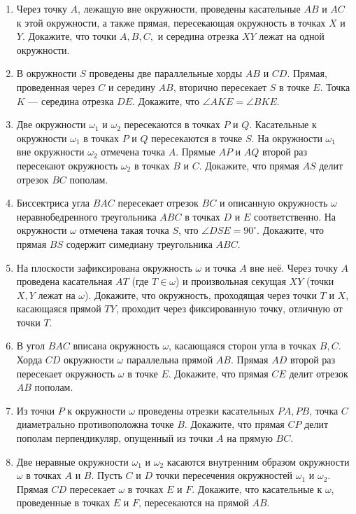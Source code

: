 \documentclass{article}
\begin{document}
\begin{enumerate}[label*=\protect\fbox{\arabic{enumi}}]
\item Через точку $A$, лежащую вне окружности, проведены касательные $AB$ и $AC$ к этой окружности, а также прямая, пересекающая окружность в точках $X$ и $Y$. Докажите, что точки $A, B, C,$ и середина отрезка $XY$ лежат на одной окружности.

\item В окружности $S$ проведены две параллельные хорды $AB$ и $CD$. Прямая, проведенная через $C$ и середину $AB$, вторично пересекает $S$ в точке $E$. Точка $K$ — середина отрезка $DE$. Докажите, что $\angle AKE = \angle BKE.$

\item Две окружности $\omega_1$ и $\omega_2$ пересекаются в точках $P$ и $Q$. Касательные к окружности $\omega_1$ в точках $P$ и $Q$ пересекаются в точке $S$. На окружности $\omega_1$ вне окружности $\omega_2$
отмечена точка $A$. Прямые $AP$ и $AQ$ второй раз пересекают окружность $\omega_2$ в точках
$B$ и $C$. Докажите, что прямая $AS$ делит отрезок $BC$ пополам.

\item Биссектриса угла $BAC$ пересекает отрезок $BC$ и описанную окружность $\omega$ неравнобедренного треугольника $ABC$ в точках $D$ и $E$ соответственно. На окружности $\omega$ отмечена такая точка $S$, что $\angle DSE = 90^\circ$. Докажите, что прямая $BS$ содержит симедиану треугольника $ABC$.

\item На плоскости зафиксирована окружность $\omega$ и точка $A$ вне неё. Через точку $A$
проведена касательная $AT$ (где $T \in \omega$) и произвольная секущая $XY$ (точки $X, Y$
лежат на $\omega$). Докажите, что окружность, проходящая через точки $T$ и $X$, касающаяся прямой $TY$, проходит через фиксированную точку, отличную от точки $T$.

\item В угол $BAC$ вписана окружность $\omega$, касающаяся сторон угла в точках $B, C$. Хорда $CD$ окружности $\omega$ параллельна прямой $AB$. Прямая $AD$ второй раз пересекает окружность $\omega$ в точке $E$. Докажите, что прямая $CE$ делит отрезок $AB$ пополам.

\item Из точки $P$ к окружности $\omega$ проведены отрезки касательных $PA, PB$, точка $C$ диаметрально противоположна точке $B$. Докажите, что прямая $CP$ делит пополам перпендикуляр, опущенный из точки $A$ на прямую $BC$.

\item Две неравные окружности $\omega_1$ и $\omega_2$ касаются внутренним образом окружности $\omega$ в точках $A$ и $B$. Пусть $C$ и $D$ точки пересечения окружностей $\omega_1$ и $\omega_2$. Прямая $CD$ пересекает $\omega$ в точках $E$ и $F$.
Докажите, что касательные к $\omega$, проведенные в точках $E$ и $F$, пересекаются на прямой $AB$.


\end{enumerate}
\end{document}
